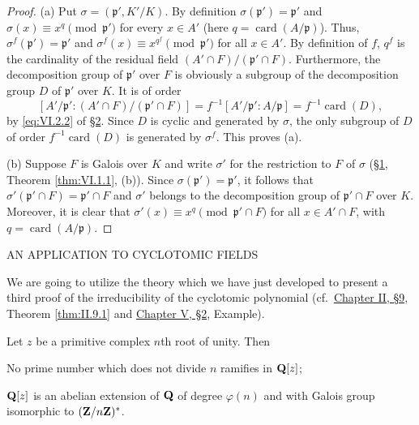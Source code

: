 \begin{proof}
(a) Put $\sigma=(\mathfrak{p}',K'/K)$. By definition
$\sigma(\mathfrak{p}')=\mathfrak{p}'$ and
$\sigma(x)\equiv x^{q}\pmod{\mathfrak{p}'}$ for every $x\in A'$ (here
$q=\operatorname{card}(A/\mathfrak{p})$). Thus,
$\sigma^{f}(\mathfrak{p}')=\mathfrak{p}'$ and
$\sigma^{f}(x)\equiv x^{q^{f}}\pmod{\mathfrak{p}'}$ for all $x\in A'$. By
definition of $f$, $q^{f}$ is the cardinality of the residual field
$(A'\cap F)/(\mathfrak{p}'\cap F)$. Furthermore, the decomposition group
of $\mathfrak{p}'$ over $F$ is obviously a subgroup of the decomposition
group $D$ of $\mathfrak{p}'$ over $K$. It is of order
\[
[A'/\mathfrak{p}':(A'\cap F)/(\mathfrak{p}'\cap F)]
=f^{-1}[A'/\mathfrak{p}':A/\mathfrak{p}]
=f^{-1}\operatorname{card}(D),
\]
by \eqref{eq:VI.2.2} of \hyperref[sec:6.2]{§2}. Since $D$ is cyclic and generated by
$\sigma$, the only subgroup of $D$ of order
$f^{-1}\operatorname{card}(D)$ is generated by $\sigma^{f}$. This proves
(a).

(b) Suppose $F$ is Galois over $K$ and write $\sigma'$ for the
restriction to $F$ of $\sigma$ (\hyperref[sec:6.1]{§1}, Theorem \ref{thm:VI.1.1}, (b)). Since
$\sigma(\mathfrak{p}')=\mathfrak{p}'$, it follows that
$\sigma'(\mathfrak{p}'\cap F)=\mathfrak{p}'\cap F$ and $\sigma'$ belongs
to the decomposition group of $\mathfrak{p}'\cap F$ over $K$. Moreover, it
is clear that
$\sigma'(x)\equiv x^{q}\pmod{\mathfrak{p}'\cap F}$ for all
$x\in A'\cap F$, with $q=\operatorname{card}(A/\mathfrak{p})$.
\end{proof}

%
        {AN APPLICATION TO CYCLOTOMIC FIELDS}

We are going to utilize the theory which we have just developed to present
a third proof of the irreducibility of the cyclotomic polynomial (cf.\
\hyperref[sec:2.9]{Chapter II, §9}, Theorem \ref{thm:II.9.1} and \hyperref[sec:5.2]{Chapter V, §2}, Example).

\begin{theorem}
\label{thm:VI.4.1}
Let $z$ be a primitive complex $n$th root of unity. Then
\begin{alist}
\item No prime number which does not divide $n$ ramifies in $\mathbf{Q}[z]$;
\item $\mathbf{Q}[z]$ is an abelian extension of $\mathbf{Q}$ of degree $\varphi(n)$ and
with Galois group isomorphic to $(\mathbf{Z}/n\mathbf{Z})^{*}$.
\end{alist}
\end{theorem}

